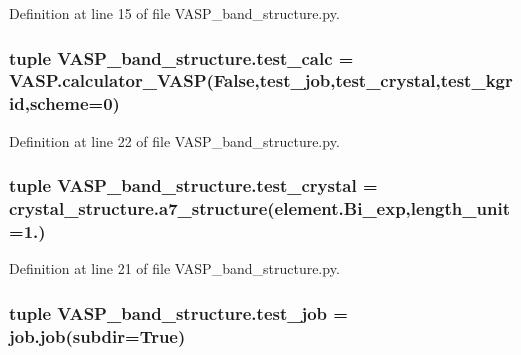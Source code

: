 Definition at line 15 of file V\+A\+S\+P\+\_\+band\+\_\+structure.\+py.

\hypertarget{namespace_v_a_s_p__band__structure_a8f94831061241e002ee2f542e137426e}{
\subsubsection[{test\+\_\+calc}]{\setlength{\rightskip}{0pt plus 5cm}tuple V\+A\+S\+P\+\_\+band\+\_\+structure.\+test\+\_\+calc = V\+A\+S\+P.\+calculator\+\_\+\+V\+A\+S\+P(False,{\bf test\+\_\+job},{\bf test\+\_\+crystal},{\bf test\+\_\+kgrid},scheme=0)}}\label{namespace_v_a_s_p__band__structure_a8f94831061241e002ee2f542e137426e}


Definition at line 22 of file V\+A\+S\+P\+\_\+band\+\_\+structure.\+py.

\hypertarget{namespace_v_a_s_p__band__structure_a3ba4ce987c572684aca44c2be79e8ff0}{
\subsubsection[{test\+\_\+crystal}]{\setlength{\rightskip}{0pt plus 5cm}tuple V\+A\+S\+P\+\_\+band\+\_\+structure.\+test\+\_\+crystal = crystal\+\_\+structure.\+a7\+\_\+structure(element.\+Bi\+\_\+exp,length\+\_\+unit=1.)}}\label{namespace_v_a_s_p__band__structure_a3ba4ce987c572684aca44c2be79e8ff0}


Definition at line 21 of file V\+A\+S\+P\+\_\+band\+\_\+structure.\+py.

\hypertarget{namespace_v_a_s_p__band__structure_a0257c119debb1013e8d8cba8000d12f6}{
\subsubsection[{test\+\_\+job}]{\setlength{\rightskip}{0pt plus 5cm}tuple V\+A\+S\+P\+\_\+band\+\_\+structure.\+test\+\_\+job = job.\+job(subdir=True)}}\label{namespace_v_a_s_p__band__structure_a0257c119debb1013e8d8cba8000d12f6}


